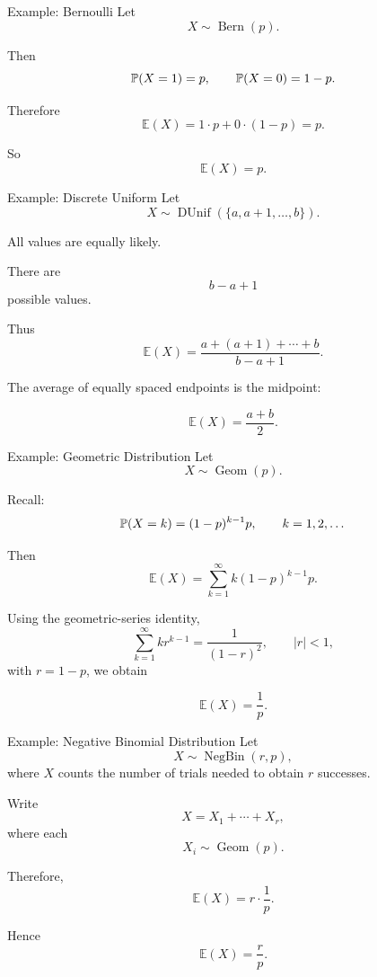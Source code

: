 \begin{frame}{Example: Bernoulli}
Let
\[
X\sim \operatorname{Bern}(p).
\]

Then
\[
\mathbb{P}(X=1)=p,
\qquad
\mathbb{P}(X=0)=1-p.
\]

Therefore
\[
\mathbb{E}(X)
=
1\cdot p+0\cdot(1-p)
=
p.
\]

So
\[
{\mathbb{E}(X)=p.}
\]
\end{frame}




\begin{frame}{Example: Discrete Uniform}
Let
\[
X\sim \operatorname{DUnif}(\{a,a+1,\dots,b\}).
\]

All values are equally likely.

There are
\[
b-a+1
\]
possible values.

Thus
\[
\mathbb{E}(X)
=
\frac{a+(a+1)+\cdots+b}{b-a+1}.
\]

The average of equally spaced endpoints is the midpoint:

\[
\boxed{
\mathbb{E}(X)=\frac{a+b}{2}.
}
\]
\end{frame}






\begin{frame}{Example: Geometric Distribution}
Let
\[
X\sim \operatorname{Geom}(p).
\]

Recall:
\[
\mathbb{P}(X=k)
=
(1-p)^{k-1}p,
\qquad
k=1,2,\dots
\]

Then
\[
\mathbb{E}(X)
=
\sum_{k=1}^{\infty}
k(1-p)^{k-1}p.
\]

Using the geometric-series identity,
\[
\sum_{k=1}^\infty kr^{k-1}
=
\frac1{(1-r)^2},
\qquad |r|<1,
\]
with $r=1-p$, we obtain

\[
{
\mathbb{E}(X)=\frac1p.
}
\]
\end{frame}


\begin{frame}{Example: Negative Binomial Distribution}
Let
\[
X\sim \operatorname{NegBin}(r,p),
\]
where $X$ counts the number of trials needed to obtain $r$ successes.

Write
\[
X=X_1+\cdots+X_r,
\]
where each
\[
X_i\sim \operatorname{Geom}(p).
\]

Therefore,
\[
\mathbb{E}(X)
=
r\cdot \frac1p.
\]

Hence
\[
{
\mathbb{E}(X)=\frac{r}{p}.
}
\]
\end{frame}

